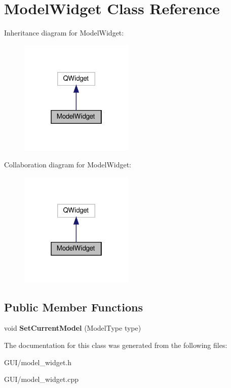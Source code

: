 \hypertarget{classModelWidget}{}\section{Model\+Widget Class Reference}
\label{classModelWidget}


Inheritance diagram for Model\+Widget\+:\nopagebreak
\begin{figure}[H]
\begin{center}
\leavevmode
\includegraphics[width=154pt]{classModelWidget__inherit__graph}
\end{center}
\end{figure}


Collaboration diagram for Model\+Widget\+:\nopagebreak
\begin{figure}[H]
\begin{center}
\leavevmode
\includegraphics[width=154pt]{classModelWidget__coll__graph}
\end{center}
\end{figure}
\subsection*{Public Member Functions}
\begin{DoxyCompactItemize}
\item 
\mbox{\label{classModelWidget_a8f68ed6c550a5c4b9839ca6c5c77aa42}} 
void {\bfseries Set\+Current\+Model} (Model\+Type type)
\end{DoxyCompactItemize}


The documentation for this class was generated from the following files\+:\begin{DoxyCompactItemize}
\item 
G\+U\+I/model\+\_\+widget.\+h\item 
G\+U\+I/model\+\_\+widget.\+cpp\end{DoxyCompactItemize}
